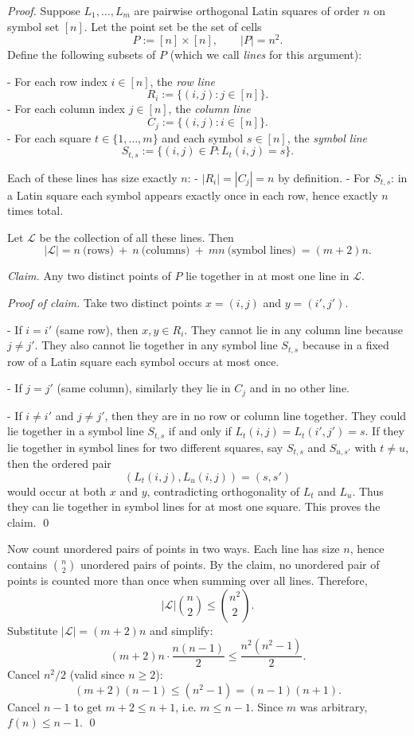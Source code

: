 \emph{Proof.}
Suppose $L_1,\dots,L_m$ are pairwise orthogonal Latin squares of order $n$ on symbol set $[n]$.
Let the point set be the set of cells
\[
P := [n]\times[n],\qquad |P|=n^2.
\]
Define the following subsets of $P$ (which we call \emph{lines} for this argument):

- For each row index $i\in[n]$, the \emph{row line}
  \[R_i := \{(i,j): j\in[n]\}.\]
- For each column index $j\in[n]$, the \emph{column line}
  \[C_j := \{(i,j): i\in[n]\}.\]
- For each square $t\in\{1,\dots,m\}$ and each symbol $s\in[n]$, the \emph{symbol line}
  \[S_{t,s} := \{(i,j)\in P: L_t(i,j)=s\}.\]

Each of these lines has size exactly $n$:
- $|R_i|=|C_j|=n$ by definition.
- For $S_{t,s}$: in a Latin square each symbol appears exactly once in each row, hence exactly $n$ times total.

Let $\mathcal L$ be the collection of all these lines. Then
\[
|\mathcal L| = n \ \text{(rows)}\ +\ n\ \text{(columns)}\ +\ mn\ \text{(symbol lines)}\ = (m+2)n.
\]

\emph{Claim.} Any two distinct points of $P$ lie together in at most one line in $\mathcal L$.

\emph{Proof of claim.}
Take two distinct points $x=(i,j)$ and $y=(i',j')$.

- If $i=i'$ (same row), then $x,y\in R_i$. They cannot lie in any column line because $j\ne j'$. They also cannot lie together in any symbol line $S_{t,s}$ because in a fixed row of a Latin square each symbol occurs at most once.

- If $j=j'$ (same column), similarly they lie in $C_j$ and in no other line.

- If $i\ne i'$ and $j\ne j'$, then they are in no row or column line together. They could lie together in a symbol line $S_{t,s}$ if and only if $L_t(i,j)=L_t(i',j')=s$.
If they lie together in symbol lines for two different squares, say $S_{t,s}$ and $S_{u,s'}$ with $t\ne u$, then the ordered pair
\[(L_t(i,j),L_u(i,j))=(s,s')\]
would occur at both $x$ and $y$, contradicting orthogonality of $L_t$ and $L_u$.
Thus they can lie together in symbol lines for at most one square.
This proves the claim.
\qed

Now count unordered pairs of points in two ways.
Each line has size $n$, hence contains $\binom{n}{2}$ unordered pairs of points.
By the claim, no unordered pair of points is counted more than once when summing over all lines. Therefore,
\[
|\mathcal L|\binom{n}{2} \le \binom{n^2}{2}.
\]
Substitute $|\mathcal L|=(m+2)n$ and simplify:
\[
(m+2)n\cdot \frac{n(n-1)}{2} \le \frac{n^2(n^2-1)}{2}.
\]
Cancel $n^2/2$ (valid since $n\ge 2$):
\[
(m+2)(n-1) \le (n^2-1) = (n-1)(n+1).
\]
Cancel $n-1$ to get $m+2\le n+1$, i.e. $m\le n-1$.
Since $m$ was arbitrary, $f(n)\le n-1$.
\qed

